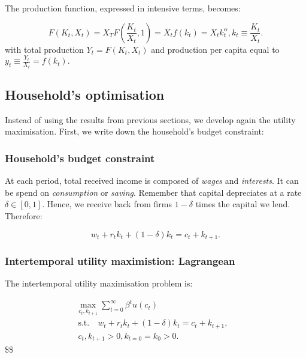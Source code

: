 \documentclass[11pt,a4paper,english]{article}
\begin{document}
The production function, expressed in intensive terms, becomes:

\[F(K_{t}, X_{t}) = X_{T} F\left(\frac{K_{t}}{X_{t}},1\right) = X_{t} f(k_{t}) = X_{t} k_{t}^{\alpha}, k_{t} \equiv \frac{K_{t}}{X_{t}}.\]
with total production \(Y_{t} = F(K_{t},X_{t})\) and production per
capita equal to \(y_{t} \equiv \frac{Y_{t}}{X_{t}} = f(k_{t}).\)

\hypertarget{households-optimisation}{%
\subsection{Household's optimisation}\label{households-optimisation}}

Instead of using the results from previous sections, we develop again
the utility maximisation. First, we write down the household's budget
constraint:

\hypertarget{households-budget-constraint-1}{%
\subsubsection{Household's budget
constraint}\label{households-budget-constraint-1}}

At each period, total received income is composed of \emph{wages} and
\emph{interests}. It can be spend on \emph{consumption} or
\emph{saving}. Remember that capital depreciates at a rate
\(\delta \in [0,1].\) Hence, we receive back from firms \(1-\delta\)
times the capital we lend. Therefore:

\[ w_{t} + r_{t}k_{t} + (1-\delta)k_{t} = c_{t} + k _{t+1}.\]

\hypertarget{intertemporal-utility-maximistion-lagrangean}{%
\subsubsection{Intertemporal utility maximistion:
Lagrangean}\label{intertemporal-utility-maximistion-lagrangean}}

The intertemporal utility maximisation problem is:

\begin{eqnarray}
\max_{c_{t}, k_{t+1}}  \sum_{t=0}^{\infty} \beta^{t} u(c_{t}) & \\\
\mathrm{s.t.} \quad      w_{t} + r_{t} k_{t} + (1-\delta)k_{t} = c_{t} + k_{t+1}, \\\
         c_{t}, k_{t+1} >0, k_{t=0} = k_{0} > 0.
\end{eqnarray} \$\$
\end{document}
